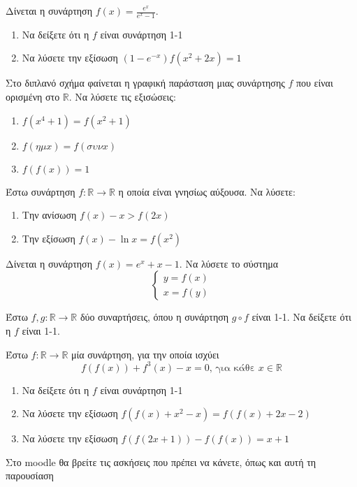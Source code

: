 \documentclass{presentation}
\begin{document}
\begin{askisi}
  Δίνεται η συνάρτηση $f(x)=\frac{e^x}{e^x-1}$.
  \begin{enumerate}
    \item Να δείξετε ότι η $f$ είναι συνάρτηση 1-1 \pause
    \item Να λύσετε την εξίσωση $(1-e^{-x})f(x^2+2x)=1$
  \end{enumerate}
\end{askisi}

\begin{askisi}
  Στο διπλανό σχήμα φαίνεται η γραφική παράσταση μιας συνάρτησης $f$ που είναι ορισμένη στο $\mathbb{R}$. Να λύσετε τις εξισώσεις:
  \begin{enumerate}
    \item $f(x^4+1)=f(x^2+1)$ \pause
    \item $f(ημ x)=f(συν x)$ \pause
    \item $f\left( f(x) \right)=1$
  \end{enumerate}
\end{askisi}

\begin{askisi}
  Έστω συνάρτηση $f:\mathbb{R}\to \mathbb{R}$ η οποία είναι γνησίως αύξουσα. Να λύσετε:
  \begin{enumerate}
    \item Την ανίσωση $f(x)-x>f(2x)$ \pause
    \item Την εξίσωση $f(x)-\ln x=f(x^2)$
  \end{enumerate}
\end{askisi}

\begin{askisi}
  Δίνεται η συνάρτηση $f(x)=e^x+x-1$. Να λύσετε το σύστημα
  $$\begin{cases}
      y=f(x) \\
      x=f(y)
    \end{cases}$$
\end{askisi}

\begin{askisi}
  Έστω $f,g:\mathbb{R}\to\mathbb{R}$ δύο συναρτήσεις, όπου η συνάρτηση $g\circ f$ είναι 1-1. Να δείξετε ότι η $f$ είναι 1-1.
\end{askisi}

\begin{askisi}
  Έστω $f:\mathbb{R}\to\mathbb{R}$ μία συνάρτηση, για την οποία ισχύει
  $$f\left(f(x)\right)+f^3(x)-x=0\text{, για κάθε }x\in\mathbb{R}$$
  \begin{enumerate}
    \item Να δείξετε ότι η $f$ είναι συνάρτηση 1-1 \pause
    \item Να λύσετε την εξίσωση $f\left(f(x)+x^2-x\right)=f\left(f(x)+2x-2\right)$ \pause
    \item Να λύσετε την εξίσωση $f\left(f(2x+1)\right)-f\left(f(x)\right)=x+1$
  \end{enumerate}
\end{askisi}

\begin{frame}
  Στο moodle θα βρείτε τις ασκήσεις που πρέπει να κάνετε, όπως και αυτή τη παρουσίαση
\end{frame}
\end{document}

